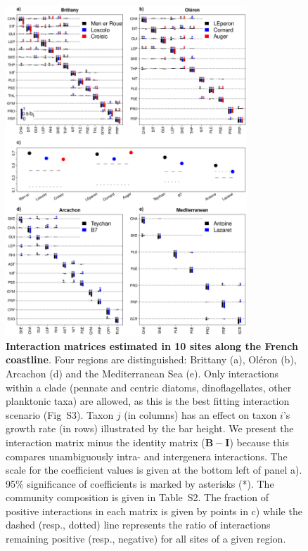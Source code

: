 \documentclass[10pt]{article}
\begin{document}
\begin{figure}[!ht]
\centering %
 \includegraphics[width=0.81\textwidth]{biotic_interaction_matrices_MainFig_allin1_v4}
\caption{\textbf{Interaction matrices estimated in 10 sites along the French
coastline}. Four regions are distinguished: Brittany (a), Oléron (b),
Arcachon (d) and the Mediterranean Sea (e). Only interactions within
a clade (pennate and centric diatoms, dinoflagellates, other planktonic
taxa) are allowed, as this is the best fitting interaction scenario
(Fig~S3). Taxon $j$ (in columns) has an effect on taxon $i$'s growth rate (in rows) illustrated by the
bar height. We present the interaction
matrix minus the identity matrix ($\mathbf{B}-\mathbf{I}$) because
this compares unambiguously intra- and intergenera interactions. The
scale for the coefficient values is given at the bottom left of panel
a). 95\% significance of coefficients is marked by asterisks ({*}).
The community composition is given in Table~S2. The fraction of positive
interactions in each matrix is given by points in c) while the dashed
(resp., dotted) line represents the ratio of interactions remaining
positive (resp., negative) for all sites of a given region.}
\label{fig:Interaction-matrices} 
\end{figure}
\end{document}
